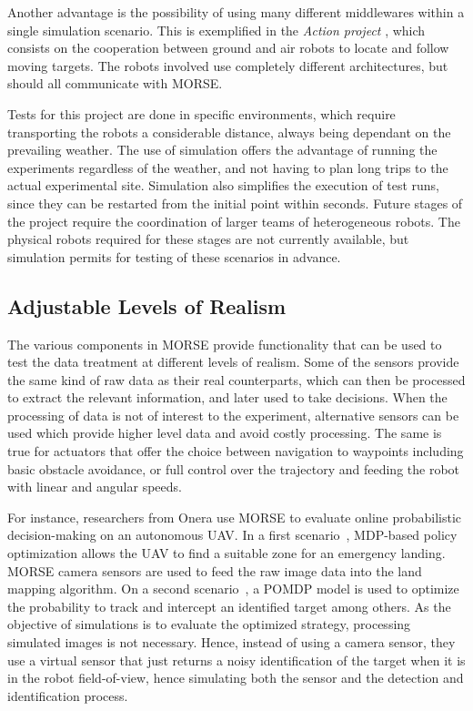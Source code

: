 \documentclass{llncs}
\begin{document}
Another advantage is the possibility of using many different middlewares within
a single simulation scenario. This is exemplified in the \emph{Action project}
\cite{6106782}, which consists on the cooperation between ground
and air robots to locate and follow moving targets.
The robots involved use completely different architectures, but should all
communicate with MORSE.

Tests for this project are done in specific environments, which require
transporting the robots a considerable distance, always being dependant on the
prevailing weather.  The use of
simulation offers the advantage of running the experiments regardless of the
weather, and not having to plan long trips to the actual experimental site.
Simulation also simplifies the execution of test runs, since they can be
restarted from the initial point within seconds.  Future stages of the project
require the coordination of larger teams of heterogeneous robots. The physical
robots required for these stages are not currently available, but simulation
permits for testing of these scenarios in advance.


\subsection{Adjustable Levels of Realism}
\label{section:realism}

The various components in MORSE provide functionality that can be used to test
the data treatment at different levels of realism. Some of the sensors provide
the same kind of raw data as their real counterparts, which can then be
processed to extract the relevant information, and later used to take
decisions. When the processing of data is not of interest to the experiment,
alternative sensors can be used which provide higher level data and avoid
costly processing. The same is true for actuators that offer the choice
between navigation to waypoints including basic obstacle avoidance, or full
control over the trajectory and feeding the robot with linear and angular
speeds.

For instance, researchers from Onera use MORSE to evaluate online probabilistic
decision-making on an autonomous UAV. In a first scenario~\cite{teichteil2011},
MDP-based policy optimization allows the UAV to find a suitable zone for an
emergency landing. MORSE camera sensors are used to feed the raw image data
into the land mapping algorithm.
On a second scenario~\cite{carvalho2012}, a POMDP model is used to optimize the
probability to track and intercept an identified target among others. As the
objective of simulations is to evaluate the optimized strategy, processing
simulated images is not necessary. Hence, instead of using a camera sensor,
they use a virtual sensor that just returns a noisy identification of the
target when it is in the robot field-of-view, hence simulating both the sensor
and the detection and identification process.
\end{document}

